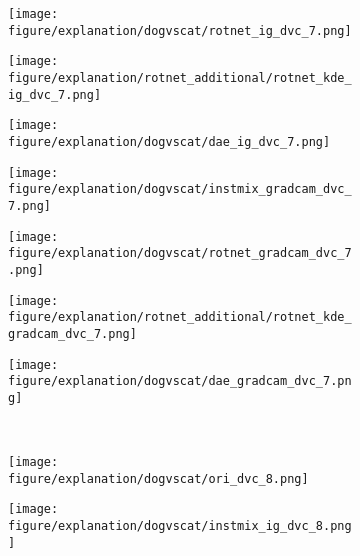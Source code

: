 \documentclass{article} \usepackage{iclr2021_conference,times}
\begin{document}
\begin{figure}[h!]
\begin{subfigure}{.11\textwidth}
\end{subfigure}
\hspace{-2mm}
\begin{subfigure}{.11\textwidth}
  \centering
  \texttt{[image: figure/explanation/dogvscat/rotnet\_ig\_dvc\_7.png]}
\end{subfigure}
\hspace{-2mm}
\begin{subfigure}{.11\textwidth}
  \centering
  \texttt{[image: figure/explanation/rotnet\_additional/rotnet\_kde\_ig\_dvc\_7.png]}
\end{subfigure}
\hspace{-2mm}
\begin{subfigure}{.11\textwidth}
  \centering
  \texttt{[image: figure/explanation/dogvscat/dae\_ig\_dvc\_7.png]}
\end{subfigure}
\hspace{-2mm}
\begin{subfigure}{.11\textwidth}
  \centering
  \texttt{[image: figure/explanation/dogvscat/instmix\_gradcam\_dvc\_7.png]}
\end{subfigure}
\hspace{-2mm}
\begin{subfigure}{.11\textwidth}
  \centering
  \texttt{[image: figure/explanation/dogvscat/rotnet\_gradcam\_dvc\_7.png]}
\end{subfigure}
\hspace{-2mm}
\begin{subfigure}{.11\textwidth}
  \centering
  \texttt{[image: figure/explanation/rotnet\_additional/rotnet\_kde\_gradcam\_dvc\_7.png]}
\end{subfigure}
\hspace{-2mm}
\begin{subfigure}{.11\textwidth}
  \centering
  \texttt{[image: figure/explanation/dogvscat/dae\_gradcam\_dvc\_7.png]}
\end{subfigure}\\
\begin{subfigure}{.11\textwidth}
  \centering
  \texttt{[image: figure/explanation/dogvscat/ori\_dvc\_8.png]}
\end{subfigure}
\hspace{-2mm}
\begin{subfigure}{.11\textwidth}
  \centering
  \texttt{[image: figure/explanation/dogvscat/instmix\_ig\_dvc\_8.png]}
\end{subfigure}

\end{figure}
\end{document}

